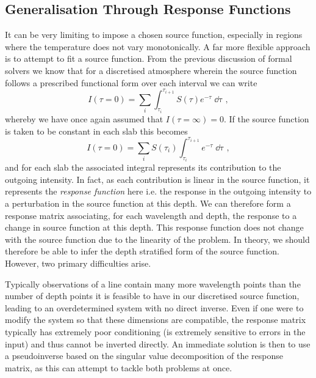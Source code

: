 \subsection{Generalisation Through Response Functions}\label{Sec:IntroRfs}


It can be very limiting to impose a chosen source function, especially in regions where the temperature does not vary monotonically.
A far more flexible approach is to attempt to fit a source function.
From the previous discussion of formal solvers we know that for a discretised atmosphere wherein the source function follows a prescribed functional form over each interval we can write
\begin{equation}
    I(\tau=0) = \sum_i \int_{\tau_i}^{\tau_{i+1}} S(\tau)e^{-\tau} \mathop{\dd{}\tau},
\end{equation}
whereby we have once again assumed that $I(\tau=\infty)=0$.
If the source function is taken to be constant in each slab this becomes
\begin{equation}\label{Eq:LinearResponse}
    I(\tau=0) = \sum_i S(\tau_i) \int_{\tau_i}^{\tau_{i+1}} e^{-\tau} \mathop{\dd{}\tau},
\end{equation}
and for each slab the associated integral represents its contribution to the outgoing intensity.
In fact, as each contribution is linear in the source function, it represents the \emph{response function} here i.e. the response in the outgoing intensity to a perturbation in the source function at this depth.
We can therefore form a response matrix associating, for each wavelength and depth, the response to a change in source function at this depth.
This response function does not change with the source function due to the linearity of the problem.
In theory, we should therefore be able to infer the depth stratified form of the source function.
However, two primary difficulties arise.

Typically observations of a line contain many more wavelength points than the number of depth points it is feasible to have in our discretised source function, leading to an overdetermined system with no direct inverse.
Even if one were to modify the system so that these dimensions are compatible, the response matrix typically has extremely poor conditioning (is extremely sensitive to errors in the input) and thus cannot be inverted directly.
An immediate solution is then to use a pseudoinverse based on the singular value decomposition of the response matrix, as this can attempt to tackle both problems at once.

